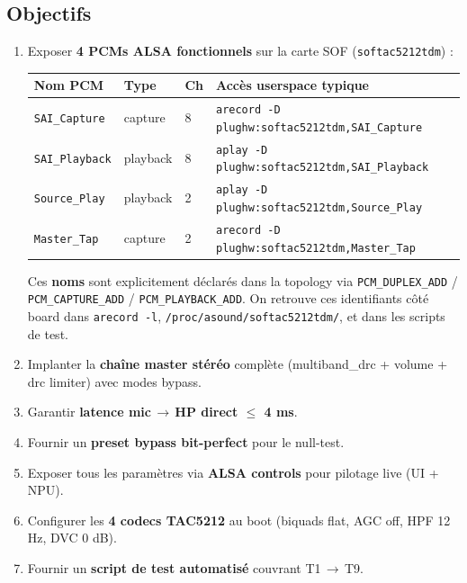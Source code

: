 \documentclass[11pt,a4paper]{article}
\begin{document}
\subsection{Objectifs}
\begin{enumerate}[leftmargin=*, itemsep=2pt]
  \item Exposer \textbf{4 PCMs ALSA fonctionnels} sur la carte SOF (\texttt{softac5212tdm}) :
    \begin{center}
    \begin{tabularx}{0.95\textwidth}{llll}
      \toprule
      \textbf{Nom PCM} & \textbf{Type} & \textbf{Ch} & \textbf{Accès userspace typique} \\
      \midrule
      \texttt{SAI\_Capture} & capture & 8 & \texttt{arecord -D plughw:softac5212tdm,SAI\_Capture} \\
      \texttt{SAI\_Playback} & playback & 8 & \texttt{aplay -D plughw:softac5212tdm,SAI\_Playback} \\
      \texttt{Source\_Play} & playback & 2 & \texttt{aplay -D plughw:softac5212tdm,Source\_Play} \\
      \texttt{Master\_Tap} & capture & 2 & \texttt{arecord -D plughw:softac5212tdm,Master\_Tap} \\
      \bottomrule
    \end{tabularx}
    \end{center}
    Ces \textbf{noms} sont explicitement déclarés dans la topology via \texttt{PCM\_DUPLEX\_ADD} / \texttt{PCM\_CAPTURE\_ADD} / \texttt{PCM\_PLAYBACK\_ADD}. On retrouve ces identifiants côté board dans \texttt{arecord -l}, \texttt{/proc/asound/softac5212tdm/}, et dans les scripts de test.
  \item Implanter la \textbf{chaîne master stéréo} complète (multiband\_drc + volume + drc limiter) avec modes bypass.
  \item Garantir \textbf{latence mic\,$\rightarrow$\,HP direct $\leq$ 4 ms}.
  \item Fournir un \textbf{preset bypass bit-perfect} pour le null-test.
  \item Exposer tous les paramètres via \textbf{ALSA controls} pour pilotage live (UI + NPU).
  \item Configurer les \textbf{4 codecs TAC5212} au boot (biquads flat, AGC off, HPF 12 Hz, DVC 0 dB).
  \item Fournir un \textbf{script de test automatisé} couvrant T1\,$\rightarrow$\,T9.
\end{enumerate}
\end{document}
